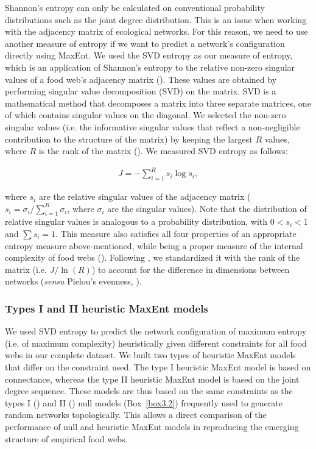 Shannon's entropy can only be calculated on conventional probability
distributions such as the joint degree distribution. This is an issue when
working with the adjacency matrix of ecological networks. For this reason, we
need to use another measure of entropy if we want to predict a network's
configuration directly using MaxEnt. We used the SVD entropy as our measure of
entropy, which is an application of Shannon's entropy to the relative non-zero
singular values of a food web's adjacency matrix (\cite{Strydom2021Svd}).
These values are obtained by performing singular value decomposition (SVD) on
the matrix. SVD is a mathematical method that decomposes a matrix into three
separate matrices, one of which contains singular values on the diagonal. We
selected the non-zero singular values (i.e. the informative singular values that
reflect a non-negligible contribution to the structure of the matrix) by keeping
the largest $R$ values, where $R$ is the rank of the matrix
(\cite{Golub1987Generalization}). We measured SVD entropy as follows: 

\begin{eqnarray}
\label{eq:svd-entropy}
       J = -\sum_{i=1}^R s_i \log s_i,
\end{eqnarray}

where $s_i$ are the relative singular values of the adjacency matrix ($s_i =
\sigma_i / \sum_{i = 1}^R \sigma_i$, where $\sigma_i$ are the singular values).
Note that the distribution of relative singular values is analogous to a
probability distribution, with $0 < s_i < 1$ and $\sum s_i = 1$. This measure
also satisfies all four properties of an appropriate entropy measure
above-mentioned, while being a proper measure of the internal complexity of food
webs (\cite{Strydom2021Svd}). Following \cite{Strydom2021Svd}, we
standardized it with the rank of the matrix (i.e. $J / \ln(R)$) to account for
the difference in dimensions between networks (\textit{sensu} Pielou's evenness,
\cite{Pielou1975Ecological}).

\subsubsection{Types I and II heuristic MaxEnt models}

We used SVD entropy to predict the network configuration of maximum entropy
(i.e. of maximum complexity) heuristically given different constraints for all
food webs in our complete dataset. We built two types of heuristic MaxEnt models
that differ on the constraint used. The type I heuristic MaxEnt model is based
on connectance, whereas the type II heuristic MaxEnt model is based on the joint
degree sequence. These models are thus based on the same constraints as the
types I (\cite{Fortuna2006Habitat}) and II (\cite{Bascompte2003Nested}) null
models (Box~\ref{box3.2}) frequently used to generate random networks
topologically. This allows a direct comparison of the performance of null and
heuristic MaxEnt models in reproducing the emerging structure of empirical food
webs. 

